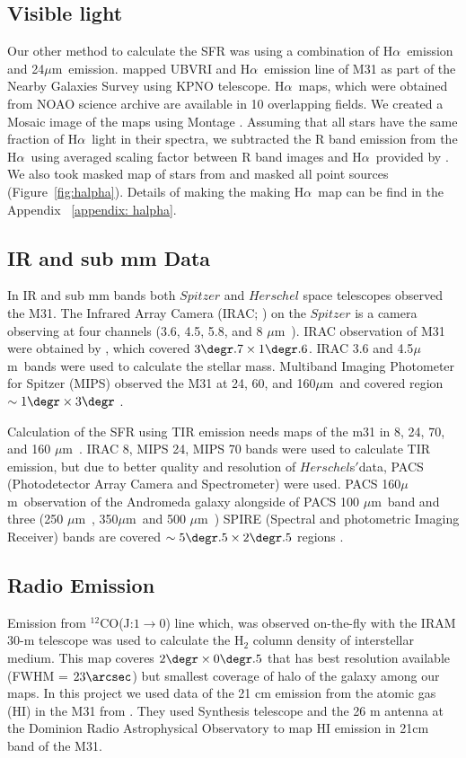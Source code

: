 \documentclass[useAMS,usenatbib]{mn2e}
\newcommand \halpha    {H$\alpha $\ }
\newcommand \um    {$\mu$m\ }
\begin{document}
\subsection{Visible light}
Our other method to calculate the SFR was using a combination of \halpha emission and 24\um emission. \cite{Massey06, Massey07} mapped UBVRI and \halpha emission line of M31 as part of the Nearby Galaxies Survey using KPNO telescope. \halpha maps, which were obtained from NOAO science archive are available in 10 overlapping fields. We created a Mosaic image of the maps using Montage \citep{Montage}. Assuming that all stars have the same fraction of \halpha light in their spectra, we subtracted the R band emission from the \halpha using averaged scaling factor between R band images and \halpha provided by \cite{Azimlu11}. We also took masked map of stars from \cite{Azimlu11} and masked all point sources (Figure~\ref{fig:halpha}). Details of making the making \halpha map can be find in the Appendix ~\ref{appendix: halpha}.

\subsection{IR and sub mm Data}
In IR and sub mm bands both $Spitzer$ \citep{Wener04} and $Herschel$ \citep{Pilbratt10}  space telescopes observed the M31. The Infrared Array Camera (IRAC; \citep{Fazio04}) on the $Spitzer$ is a camera observing at four channels (3.6, 4.5, 5.8, and 8 \um). IRAC observation of M31 were obtained by \cite{Barmby06}, which covered $3\degr.7 \times 1\degr.6$. IRAC 3.6 and 4.5\um bands  were used to calculate the stellar mass. Multiband Imaging Photometer for Spitzer (MIPS) observed the  M31 at 24, 60, and 160\um and covered region $\sim 1\degr \times 3\degr$ \citep{Gordon06}.

Calculation of the SFR using TIR emission needs maps of the m31 in 8, 24, 70, and 160 \um. IRAC 8, MIPS 24, MIPS 70 bands were used to calculate TIR emission, but due to better quality and resolution of $Herschel$s$'$data, PACS (Photodetector Array Camera and Spectrometer) \citep{Poglitch10} were used. PACS 160\um observation of the Andromeda galaxy alongside of PACS 100 \um band and three (250 \um, 350\um and 500 \um) SPIRE (Spectral and photometric Imaging Receiver) \citep{Griffin10} bands are covered $\sim 5\degr.5 \times 2\degr.5$ regions \citep{Fritz12}.

\subsection{Radio Emission}
Emission from $^{12}$CO(J:$1\rightarrow0$) line which, was observed on-the-fly with the IRAM 30-m telescope\citep{Nieten06} was used to calculate the H$_2$ column density of interstellar medium. This map coveres $2\degr \times 0\degr.5$ that has best resolution available (FWHM = $23\arcsec$) but smallest coverage of halo of the galaxy among our maps. In this project we used data of the 21 cm emission from the atomic gas (HI) in the M31 from \cite{chemin9}. They used Synthesis telescope and the 26 m antenna at the Dominion Radio Astrophysical Observatory to map HI emission in 21cm band of the M31.
\end{document}
